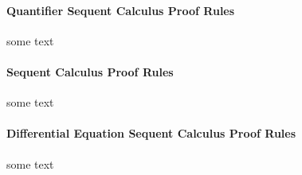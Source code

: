 \documentclass[10pt]{report}
\begin{document}
    \paragraph{Quantifier Sequent Calculus Proof Rules}
        \label{sec:quantifier-rules}

        some text

        \begin{calculus}
        \end{calculus}

    \paragraph{\dL Sequent Calculus Proof Rules}
        \label{sec:dL-rules}

        some text

        \begin{calculus}
        \end{calculus}

    \paragraph{Differential Equation Sequent Calculus Proof Rules}
        \label{sec:ode-rules}

        some text
\end{document}
